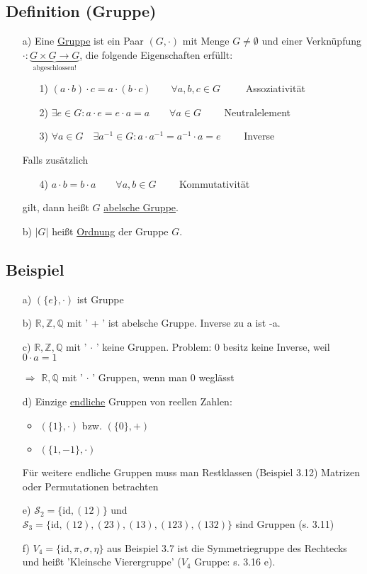 \documentclass[12pt,titlepage, pdf]{article}
\newcommand{\R}{\mathds{R}}
\newcommand{\uline}[1]{\underline{#1}}
\newcommand{\id}{\textrm{id}}
\renewcommand{\>}{\rightarrow}
\renewcommand{\*}{\cdot}
\begin{document}
\subsection{Definition (Gruppe)}
\begin{itemize}
	\item[a)] Eine \uline{Gruppe} ist ein Paar $(G, \cdot) $ mit Menge $G \neq \emptyset$ und einer Verknüpfung $\cdot : \underbrace{G \times G \rightarrow G}_{\text{abgeschlossen!}}$, die folgende Eigenschaften erfüllt:
	\begin{itemize}
		\item[1)] $(a \cdot b) \cdot c = a \cdot (b \cdot c) \qquad \forall a,b,c \in G\qquad~$ Assoziativität
		\item[2)] $\exists e \in G: a \cdot e = e \cdot a = a \qquad \forall a \in G\qquad$ Neutralelement
		\item[3)] $\forall a \in G\quad \exists a^{-1} \in G: a \cdot a^{-1} = a^{-1}\*a = e\qquad$ Inverse
	\end{itemize}
		Falls zusätzlich 
		\begin{itemize}
			\item[4)] $a \cdot b = b \cdot a \qquad  \forall a,b \in G\qquad$ Kommutativität \end{itemize}
		gilt, dann heißt $G$ \uline{abelsche Gruppe}.
	
	\item[b)] $| G |$ heißt \uline{Ordnung} der Gruppe $G$.
\end{itemize}
\subsection{Beispiel}
\begin{itemize}
	\item[a)] $(\{e\}, \cdot )$ ist Gruppe
	\item[b)] $\R, \mathds{Z}, \mathds{Q}$ mit ' + ' ist abelsche Gruppe. Inverse zu a ist -a.
	\item[c)] $\R, \mathds{Z}, \mathds{Q}$ mit ' $\cdot$ ' keine Gruppen. Problem: 0 besitz keine Inverse, weil \\
	$0 \cdot a = 1$\Lightning
	\item[$\Rightarrow$]  $\R, \mathds{Q}$ mit ' $\cdot$ ' Gruppen, wenn man 0 weglässt
	\item[d)] Einzige \uline{endliche} Gruppen von reellen Zahlen: 
	\begin{itemize}
		\item $(\{1\}, \cdot )$ bzw. $(\{0\}, + )$
		\item $(\{1,-1\}, \cdot)$
	\end{itemize}
	Für weitere endliche Gruppen muss man Restklassen (Beispiel 3.12) Matrizen oder Permutationen betrachten
	\item[e)] $\mathscr{S}_2 = \{\id, (12)\}$ und \\
	$\mathscr{S}_3 = \{\id, (12), (23),(13),(123),(132)\}$ sind Gruppen (s. 3.11)
	\item[f)] $V_4 = \{\id, \pi, \sigma, \eta \}$ aus Beispiel 3.7 ist die Symmetriegruppe des Rechtecks und heißt 'Kleinsche Vierergruppe' ($V_4$ Gruppe: s. 3.16 e).
\end{itemize}
\end{document}
